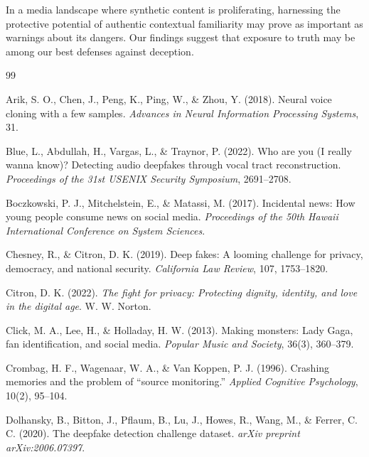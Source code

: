 \documentclass[12pt, a4paper]{article}
\begin{document}
In a media landscape where synthetic content is proliferating, harnessing the protective potential of authentic contextual familiarity may prove as important as warnings about its dangers. Our findings suggest that exposure to truth may be among our best defenses against deception.




\begin{thebibliography}{99}

Arik, S. O., Chen, J., Peng, K., Ping, W., \& Zhou, Y. (2018). Neural voice cloning with a few samples. \textit{Advances in Neural Information Processing Systems}, 31.

Blue, L., Abdullah, H., Vargas, L., \& Traynor, P. (2022). Who are you (I really wanna know)? Detecting audio deepfakes through vocal tract reconstruction. \textit{Proceedings of the 31st USENIX Security Symposium}, 2691--2708.

Boczkowski, P. J., Mitchelstein, E., \& Matassi, M. (2017). Incidental news: How young people consume news on social media. \textit{Proceedings of the 50th Hawaii International Conference on System Sciences}.

Chesney, R., \& Citron, D. K. (2019). Deep fakes: A looming challenge for privacy, democracy, and national security. \textit{California Law Review}, 107, 1753--1820.

Citron, D. K. (2022). \textit{The fight for privacy: Protecting dignity, identity, and love in the digital age}. W. W. Norton.

Click, M. A., Lee, H., \& Holladay, H. W. (2013). Making monsters: Lady Gaga, fan identification, and social media. \textit{Popular Music and Society}, 36(3), 360--379.

Crombag, H. F., Wagenaar, W. A., \& Van Koppen, P. J. (1996). Crashing memories and the problem of ``source monitoring.'' \textit{Applied Cognitive Psychology}, 10(2), 95--104.

Dolhansky, B., Bitton, J., Pflaum, B., Lu, J., Howes, R., Wang, M., \& Ferrer, C. C. (2020). The deepfake detection challenge dataset. \textit{arXiv preprint arXiv:2006.07397}.


\end{thebibliography}
\end{document}
